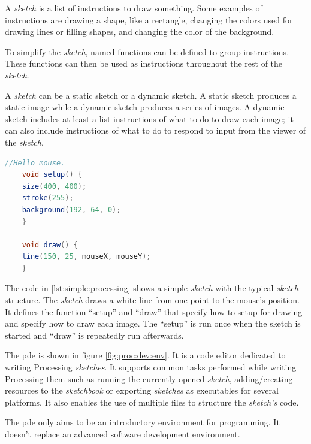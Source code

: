 \documentclass{./llncs2e/llncs}
\begin{document}
	A \emph{sketch} is a list of instructions to draw something. 
	Some examples of instructions are drawing a shape, like a rectangle, changing the colors used for drawing lines or filling shapes, and changing the color of the background.
	
	To simplify the \emph{sketch}, named functions can be defined to group instructions. 
	These functions can then be used as instructions throughout the rest of the \emph{sketch}.
	
	A \emph{sketch} can be a static sketch or a dynamic sketch. 
	A static sketch produces a static image while a dynamic sketch produces a series of images. 
	A dynamic sketch includes at least a list instructions of what to do to draw each image; it can also include instructions of what to do to respond to input from the viewer of the \emph{sketch}.
	
	\begin{lstlisting}[caption={A simple Processing sketch},label={lst:simple:processing},language=Java]
	//Hello mouse.
	void setup() {
	size(400, 400);
	stroke(255);
	background(192, 64, 0);
	}
	
	void draw() {
	line(150, 25, mouseX, mouseY);
	}
	\end{lstlisting}
	
	The code in \ref{lst:simple:processing} shows a simple \emph{sketch} with the typical \emph{sketch} structure. 
	The \emph{sketch} draws a white line from one point to the mouse's position. 
	It defines the function ``setup'' and  ``draw'' that specify how to setup for drawing and specify how to draw each image. 
	The ``setup'' is run once when the sketch is started and ``draw'' is repeatedly run afterwards.
	
	The \ac{pde} is shown in figure \ref{fig:proc:dev:env}. 
	It is a code editor dedicated to writing Processing \emph{sketches}. 
	It supports common tasks performed while writing Processing them such as running the currently opened \emph{sketch}, adding/creating resources to the \emph{sketchbook} or exporting \emph{sketches} as executables for several platforms. 
	It also enables the use of multiple files to structure the \emph{sketch's} code.
	
	The \ac{pde} only aims to be an introductory environment for programming. 
	It doesn't replace an advanced software development environment.
	
\end{document}
